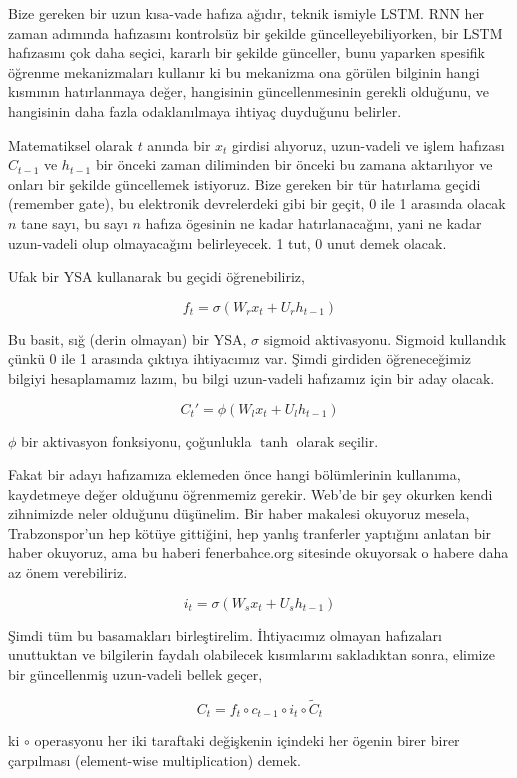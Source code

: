 \documentclass[12pt,fleqn]{article}\usepackage{../../common}
\begin{document}
Bize gereken bir uzun kısa-vade hafıza ağıdır, teknik ismiyle LSTM. RNN her
zaman adımında hafızasını kontrolsüz bir şekilde güncelleyebiliyorken, bir
LSTM hafızasını çok daha seçici, kararlı bir şekilde günceller, bunu
yaparken spesifik öğrenme mekanizmaları kullanır ki bu mekanizma ona
görülen bilginin hangi kısmının hatırlanmaya değer, hangisinin
güncellenmesinin gerekli olduğunu, ve hangisinin daha fazla odaklanılmaya
ihtiyaç duyduğunu belirler.

Matematiksel olarak $t$ anında bir $x_t$ girdisi alıyoruz, uzun-vadeli ve
işlem hafızası $C_{t-1}$ ve $h_{t-1}$ bir önceki zaman diliminden bir
önceki bu zamana aktarılıyor ve onları bir şekilde güncellemek
istiyoruz. Bize gereken bir tür hatırlama geçidi (remember gate), bu
elektronik devrelerdeki gibi bir geçit, 0 ile 1 arasında olacak $n$ tane
sayı, bu sayı $n$ hafıza ögesinin ne kadar hatırlanacağını, yani ne kadar
uzun-vadeli olup olmayacağını belirleyecek. 1 tut, 0 unut demek olacak.

Ufak bir YSA kullanarak bu geçidi öğrenebiliriz,

$$ f_t = \sigma (W_r x_t + U_r h_{t-1}) $$

Bu basit, sığ (derin olmayan) bir YSA, $\sigma$ sigmoid aktivasyonu. Sigmoid
kullandık çünkü 0 ile 1 arasında çıktıya ihtiyacımız var. Şimdi girdiden
öğreneceğimiz bilgiyi hesaplamamız lazım, bu bilgi uzun-vadeli hafızamız
için bir aday olacak. 

$$ C_t' = \phi(W_l x_t + U_l h_{t-1})$$

$\phi$ bir aktivasyon fonksiyonu, çoğunlukla $\tanh$ olarak seçilir. 

Fakat bir adayı hafızamıza eklemeden önce hangi bölümlerinin kullanıma,
kaydetmeye değer olduğunu öğrenmemiz gerekir. Web'de bir şey okurken kendi
zihnimizde neler olduğunu düşünelim. Bir haber makalesi okuyoruz mesela,
Trabzonspor'un hep kötüye gittiğini, hep yanlış tranferler yaptığını
anlatan bir haber okuyoruz, ama bu haberi fenerbahce.org sitesinde
okuyorsak o habere daha az önem verebiliriz.

$$ i_t = \sigma (W_s x_t + U_s h_{t-1}) $$

Şimdi tüm bu basamakları birleştirelim. İhtiyacımız olmayan hafızaları
unuttuktan ve bilgilerin faydalı olabilecek kısımlarını sakladıktan sonra,
elimize bir güncellenmiş uzun-vadeli bellek geçer, 

$$ C_t = f_t \circ c_{t-1} \circ i_t \circ \tilde{C}_t $$

ki $\circ$ operasyonu her iki taraftaki değişkenin içindeki her ögenin
birer birer çarpılması (element-wise multiplication) demek.
\end{document}
